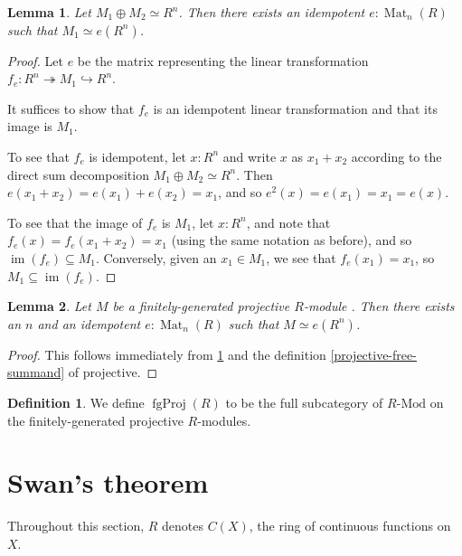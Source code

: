 \documentclass[11pt]{article}
\newcommand{\Mat}{\operatorname{Mat}}
\newcommand{\fgProj}{\operatorname{fgProj}}
\newcommand{\im}{\operatorname{im}}
\theoremstyle{plain}
\newtheorem{lemma}{Lemma}[section]
\theoremstyle{definition}
\newtheorem{definition}{Definition}[section]
\begin{document}
\begin{lemma} \label{lemma-fg-projective-idempotent-aux}
  Let \(M_1 \oplus M_2 \simeq R^n\). Then there exists an idempotent \(e : \Mat_n(R)\) such that \(M_1 \simeq e(R^n)\).
\end{lemma}

\begin{proof}
  Let \(e\) be the matrix representing the linear transformation \(f_e : R^n \twoheadrightarrow M_1 \hookrightarrow R^n\).

  It suffices to show that \(f_e\) is an idempotent linear transformation and that its image is \(M_1\).

  To see that \(f_e\) is idempotent, let \(x : R^n\) and write \(x\) as \(x_1 + x_2\) according to the direct sum decomposition \(M_1 \oplus M_2 \simeq R^n\). Then \(e(x_1 + x_2) = e(x_1) + e(x_2) = x_1\), and so \(e^2(x) = e(x_1) = x_1 = e(x)\).

  To see that the image of \(f_e\) is \(M_1\), let \(x : R^n\), and note that \(f_e(x) = f_e(x_1 + x_2) = x_1\) (using the same notation as before), and so \(\im(f_e) \subseteq M_1\). Conversely, given an \(x_1 \in M_1\), we see that \(f_e(x_1) = x_1\), so \(M_1 \subseteq \im(f_e)\).
\end{proof}

\begin{lemma} \label{lemma-fg-projective-idempotent}
  Let \(M\) be a finitely-generated projective \(R\)-module . Then there exists an \(n\) and an idempotent \(e : \Mat_n(R)\) such that \(M \simeq e(R^n)\).
\end{lemma}

\begin{proof}
  This follows immediately from \ref{lemma-fg-projective-idempotent-aux} and the definition \ref{projective-free-summand} of projective.
\end{proof}

\begin{definition} \label{def-category-projective-modules}
  We define \(\fgProj(R)\) to be the full subcategory of \(R\text{-Mod}\) on the finitely-generated projective \(R\)-modules.
\end{definition}

\section{Swan's theorem}

Throughout this section, \(R\) denotes \(C(X)\), the ring of continuous functions on \(X\).
\end{document}
